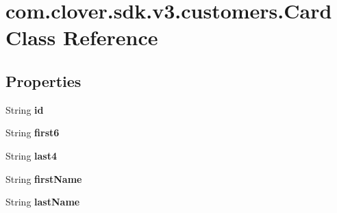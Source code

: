 \hypertarget{classcom_1_1clover_1_1sdk_1_1v3_1_1customers_1_1_card}{}\section{com.\+clover.\+sdk.\+v3.\+customers.\+Card Class Reference}
\label{classcom_1_1clover_1_1sdk_1_1v3_1_1customers_1_1_card}
\subsection*{Properties}
\begin{DoxyCompactItemize}
\item 
\mbox{\label{classcom_1_1clover_1_1sdk_1_1v3_1_1customers_1_1_card_a0eceb86d271a1f40543d4c8aa8c59326}} 
String {\bfseries id}
\item 
\mbox{\label{classcom_1_1clover_1_1sdk_1_1v3_1_1customers_1_1_card_a6adbf4ed8d0c44c7c4951244a5e760a4}} 
String {\bfseries first6}
\item 
\mbox{\label{classcom_1_1clover_1_1sdk_1_1v3_1_1customers_1_1_card_a88ced965ffe0fa39f9ef61e4f3f357b2}} 
String {\bfseries last4}
\item 
\mbox{\label{classcom_1_1clover_1_1sdk_1_1v3_1_1customers_1_1_card_ac46b6ca9992643cbc76bbf1250a3a418}} 
String {\bfseries first\+Name}
\item 
\mbox{\label{classcom_1_1clover_1_1sdk_1_1v3_1_1customers_1_1_card_adafbe217a2a181ee490d15d3bced098d}} 
String {\bfseries last\+Name}
\item 

\end{DoxyCompactItemize}
